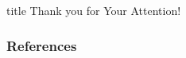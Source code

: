 \documentclass[aspectratio=169,fleqn]{beamer}
\begin{document}
\begin{frame}[plain]
  \vfill
  \centering
  \begin{beamercolorbox}[sep=8pt,center,shadow=true,rounded=true]{title}
    Thank you for Your Attention!%
    \par%
  \end{beamercolorbox}
  \vfill
\end{frame}

\begin{frame}[plain]
  \frametitle{References}
  \AtNextBibliography{\tiny}
  \begin{multicols}{2}
    \nocite{*}
    \printbibliography
  \end{multicols}
\end{frame}

\setcounter{framenumber}{\value{backupcounter}}
\end{document}
